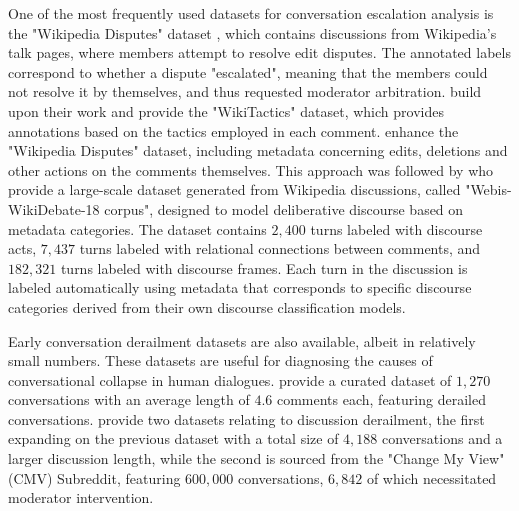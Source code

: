 One of the most frequently used datasets for conversation escalation analysis is the "Wikipedia Disputes" dataset \cite{de-kock-vlachos-2021-beg}, which contains discussions from Wikipedia's talk pages, where members attempt to resolve edit disputes. The annotated labels correspond to whether a dispute "escalated", meaning that the members could not resolve it by themselves, and thus requested moderator arbitration. \citet{dekock2022disagree} build upon their work and provide the "WikiTactics" dataset, which provides annotations based on the tactics employed in each comment. \citet{hua2018wikiconvcorpuscompleteconversational} enhance the "Wikipedia Disputes" dataset, including metadata concerning edits, deletions and other actions on the comments themselves. This approach was followed by \citet{al-khatib-etal-2018-modeling} who provide a large-scale dataset generated from Wikipedia discussions, called "Webis-WikiDebate-18 corpus", designed to model deliberative discourse based on metadata categories. The dataset contains $2,400$ turns labeled with discourse acts, $7,437$ turns labeled with relational connections between comments, and $182,321$ turns labeled with discourse frames. Each turn in the discussion is labeled automatically using metadata that corresponds to specific discourse categories derived from their own discourse classification models.

Early conversation derailment datasets are also available, albeit in relatively small numbers. These datasets are useful for diagnosing the causes of conversational collapse in human dialogues. \citet{zhang-2018-gone-awry} provide a curated dataset of $1,270$ conversations with an average length of $4.6$ comments each, featuring derailed conversations. \citet{chang-danescu-niculescu-mizil-2019-trouble} provide two datasets relating to discussion derailment, the first expanding on the previous dataset with a total size of $4,188$ conversations and a larger discussion length, while the second is sourced from the "Change My View" (CMV) Subreddit, featuring $600,000$ conversations, $6,842$ of which necessitated moderator intervention.
